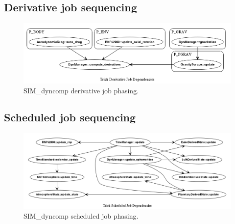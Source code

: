 \clearpage
\newpage
\subsection {Derivative job sequencing}
\begin{figure}[h]
\includegraphics [width=7in]{figs/phasing/derivative.png}
\caption{SIM\_dyncomp derivative job phasing.}
\label{fig:deriv}
\end{figure}

\clearpage
\newpage
\subsection {Scheduled job sequencing}
\begin{figure}[h]
\includegraphics [width=7in]{figs/phasing/scheduled.png}
\caption{SIM\_dyncomp scheduled job phasing.}
\label{fig:sched}
\end{figure}
